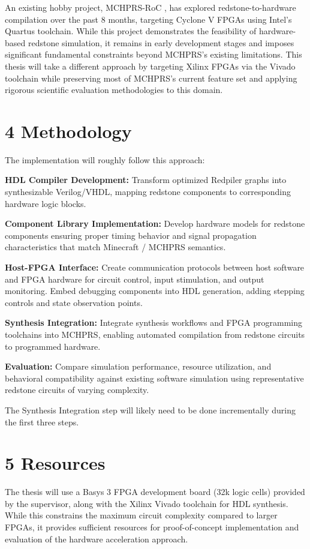 \documentclass[a4paper,11pt]{article}
\begin{document}
An existing hobby project, MCHPRS-RoC \cite{mchprsroc}, has explored redstone-to-hardware compilation over the past 8 months, targeting Cyclone V FPGAs using Intel's Quartus toolchain.
While this project demonstrates the feasibility of hardware-based redstone simulation, it remains in early development stages and imposes significant fundamental constraints beyond MCHPRS's existing limitations.
This thesis will take a different approach by targeting Xilinx FPGAs via the Vivado toolchain while preserving most of MCHPRS's current feature set and applying rigorous scientific evaluation methodologies to this domain.

\section*{4 Methodology}

The implementation will roughly follow this approach:

\textbf{HDL Compiler Development:} Transform optimized Redpiler graphs into synthesizable Verilog/VHDL, mapping redstone components to corresponding hardware logic blocks.

\textbf{Component Library Implementation:} Develop hardware models for redstone components ensuring proper timing behavior and signal propagation characteristics that match Minecraft / MCHPRS semantics.

\textbf{Host-FPGA Interface:} Create communication protocols between host software and FPGA hardware for circuit control, input stimulation, and output monitoring.
Embed debugging components into HDL generation, adding stepping controls and state observation points.

\textbf{Synthesis Integration:} Integrate synthesis workflows and FPGA programming toolchains into MCHPRS, enabling automated compilation from redstone circuits to programmed hardware.

\textbf{Evaluation:} Compare simulation performance, resource utilization, and behavioral compatibility against existing software simulation using representative redstone circuits of varying complexity.

The Synthesis Integration step will likely need to be done incrementally during the first three steps.

\section*{5 Resources}

The thesis will use a Basys 3 FPGA development board (32k logic cells) provided by the supervisor, along with the Xilinx Vivado toolchain for HDL synthesis.
While this constrains the maximum circuit complexity compared to larger FPGAs, it provides sufficient resources for proof-of-concept implementation and evaluation of the hardware acceleration approach.
\end{document}
